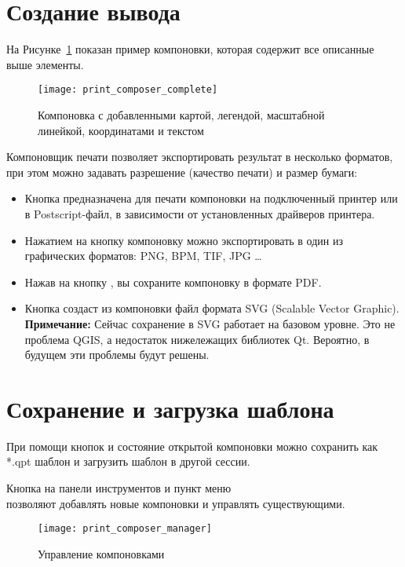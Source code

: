 \section{Создание вывода}

На Рисунке~\ref{fig:print_composer_complete} показан пример компоновки,
которая содержит все описанные выше элементы.

\begin{figure}[h]
   \centering
   \texttt{[image: print\_composer\_complete]}
   \caption{Компоновка с добавленными картой, легендой, масштабной линейкой, координатами и текстом \wincaption} \label{fig:print_composer_complete}
\end{figure}

Компоновщик печати позволяет экспортировать результат в несколько
форматов, при этом можно задавать разрешение (качество печати) и размер
бумаги:

\begin{itemize}[label=--]
\item Кнопка  предназначена для
печати компоновки на подключенный принтер или в Postscript-файл, в
зависимости от установленных драйверов принтера.
\item Нажатием на кнопку
компоновку можно экспортировать в один из графических форматов: PNG,
BPM, TIF, JPG \ldots
\item Нажав на кнопку , вы
сохраните компоновку в формате PDF.
\item Кнопка  создаст из
компоновки файл формата SVG (Scalable Vector Graphic).
\textbf{Примечание:} Сейчас сохранение в SVG работает на базовом уровне.
Это не проблема QGIS, а недостаток нижележащих библиотек Qt. Вероятно,
в будущем эти проблемы будут решены.
\end{itemize}

\section{Сохранение и загрузка шаблона}

При помощи кнопок 
и  состояние открытой
компоновки можно сохранить как *.qpt шаблон и загрузить шаблон в другой
сессии.

Кнопка 
на панели инструментов и пункт меню \\
 \arrow {}
позволяют добавлять новые компоновки и управлять существующими.

\begin{figure}[h]
   \centering
   \texttt{[image: print\_composer\_manager]}
   \caption{Управление компоновками \wincaption}
   \label{fig:print_composer_manager}
\end{figure}

\FloatBarrier
